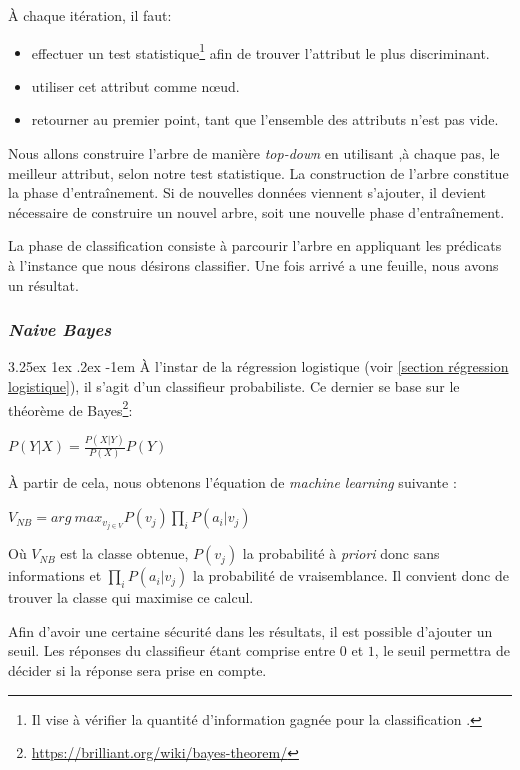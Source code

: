 \documentclass[a4paper, 11pt]{article}
\makeatletter
\renewcommand\paragraph{\@startsection{paragraph}{5}{\z@}%
  {3.25ex \@plus1ex \@minus.2ex}%
  {-1em}%
  {\normalfont\normalsize\bfseries}}
\makeatother
\begin{document}
À chaque itération, il faut:
\begin{itemize}
 \item effectuer un test statistique\footnote{Il vise à vérifier la quantité d'information gagnée pour 
 la classification \cite{id3}.} afin de trouver l'attribut le plus discriminant.
 \item utiliser cet attribut comme nœud.
 \item retourner au premier point, tant que l'ensemble des attributs n'est pas vide.
\end{itemize}
Nous allons construire l'arbre de manière \textit{top-down} en utilisant ,à chaque pas, le meilleur attribut, selon notre test statistique. La construction de l'arbre constitue la phase d'entraînement. Si de nouvelles données viennent s'ajouter, il devient nécessaire de construire un nouvel arbre, soit une nouvelle phase d'entraînement.

La phase de classification consiste à parcourir l'arbre en appliquant les prédicats à l'instance que nous désirons classifier. Une fois arrivé a une feuille, nous avons un résultat.


\subsubsection{\textit{Naive Bayes}}\label{section naive bayes}
\paragraph{}
À l'instar de la régression logistique (voir \ref{section régression logistique}), il s'agit d'un classifieur probabiliste. 
Ce dernier se base sur le théorème de Bayes\footnote{\url{https://brilliant.org/wiki/bayes-theorem/}}:
\begin{center}
$P(Y|X) = \frac{P(X|Y)}{P(X)}P(Y)$
\end{center}

À partir de cela, nous obtenons l'équation de \textit{machine learning} suivante \cite{machine_learning_automated_trading}:
\begin{center}
$V_{NB} = arg\ max_{v_{j \in V}} P(v_j) \prod\limits_i P(a_i | v_j)$
\end{center}
Où $V_{NB}$ est la classe obtenue, $P(v_j)$ la probabilité à \textit{priori} donc sans informations 
et $\prod\limits_i P(a_i | v_j)$ la probabilité de vraisemblance.
Il convient donc de trouver la classe qui maximise ce calcul.

Afin d'avoir une certaine sécurité dans les résultats, il est possible d'ajouter un seuil. 
Les réponses du classifieur étant comprise entre $0$ et $1$, le seuil permettra de décider si la réponse sera prise en compte.
\end{document}
